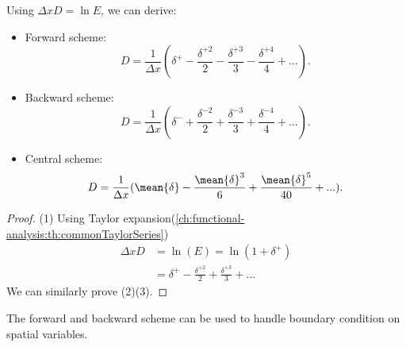 \begin{refsection}
\begin{lemma}\cite[288]{karniadakis2003parallel}
Using $\Delta x D = \ln E$, we can derive:
\begin{itemize}
	\item Forward scheme:
	$$D = \frac{1}{\Delta x}(\delta^+ - \frac{\delta^{+2}}{2} - \frac{\delta^{+3}}{3}  - \frac{\delta^{+4}}{4} + ...).$$
	\item Backward scheme:
	$$D = \frac{1}{\Delta x}(\delta^- + \frac{\delta^{-2}}{2} + \frac{\delta^{-3}}{3}  + \frac{\delta^{-4}}{4} + ...).$$
	\item Central scheme:
	$$D = \frac{1}{\Delta x}(\mean{\delta} - \frac{\mean{\delta}^{3}}{6} + \frac{\mean{\delta}^{5}}{40} + ...).$$
\end{itemize}
\end{lemma}
\begin{proof}
(1) 
Using Taylor expansion(\autoref{ch:functional-analysis:th:commonTaylorSeries})
\begin{align*}
\Delta x D &= \ln (E) = \ln(1 + \delta^+)\\
		&= \delta^+ - \frac{\delta^{+2}}{2} + \frac{\delta^{+3}}{3} + ... 
\end{align*}
We can similarly prove (2)(3).
\end{proof}

\begin{remark}
The forward and backward scheme can be used to handle boundary condition on spatial variables. 
\end{remark}


\end{refsection}
